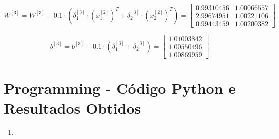 \documentclass[a4paper,12pt]{article} %
\begin{document}
\begin{enumerate}
\begin{equation*}
    W^{[3]} = W^{[3]} - 0.1 \cdot (\delta^{[3]}_1 \cdot (x^{[2]}_1)^T + \delta^{[3]}_2 \cdot (x^{[2]}_2)^T) = \begin{bmatrix} 0.99310456 & 1.00066557 \\
                                                                                                                            2.99674951 & 1.00221106 \\
                                                                                                                            0.99443459 & 1.00200382 \end{bmatrix}
\end{equation*}

\begin{equation*}
    b^{[3]} = b^{[3]} - 0.1 \cdot (\delta^{[3]}_1 + \delta^{[3]}_2) = \begin{bmatrix} 1.01003842 \\ 1.00550496 \\ 1.00869959 \end{bmatrix}
\end{equation*}

\end{enumerate}

\clearpage
\section*{Programming - Código Python e Resultados Obtidos}

\begin{enumerate}
\item 

\end{enumerate}
\end{document}
